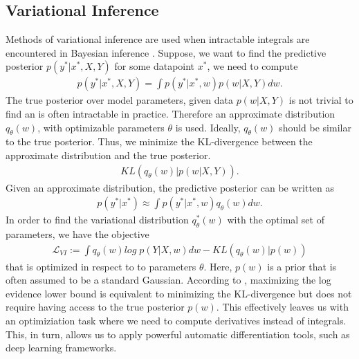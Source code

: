 \documentclass[a4paper,cleardoubleempty,BCOR1cm, 11pt]{report}
\begin{document}
\subsection{Variational Inference}\label{sec:vi}
Methods of variational inference are used when intractable integrals are encountered in Bayesian inference \cite{jordan1999introduction}. Suppose, we want to find the predictive posterior $p(y^*|x^*, X,Y)$ for some datapoint $x^*$, we need to compute
\begin{align*}
p(y^*|x^*, X,Y) = \int p(y^*|x^*, w)p(w|X,Y)dw.
\end{align*}
The true posterior over model parameters, given data $p(w|X,Y)$ is not trivial to find an is often intractable in practice. Therefore an approximate distribution $q_{\theta}(w)$, with optimizable parameters $\theta$ is used. Ideally, $q_{\theta}(w)$ should be similar to the true posterior. Thus, we minimize the KL-divergence between the approximate distribution and the true posterior.
\begin{align*}
KL(q_{\theta}(w)|p(w|X,Y)).
\end{align*}
Given an approximate distribution, the predictive posterior can be written as
\begin{align*}
p(y^*|x^*) \approx \int p(y^*|x^*, w)q_{\theta}(w)dw.
\end{align*}
In order to find the variational distribution $q_{\theta}^*(w)$ with the optimal set of parameters, we have the objective
\begin{align*}
\mathcal{L}_{VI} := \int q_{\theta}(w) log\;p(Y|X, w)dw - KL(q_{\theta}(w)|p(w))
\end{align*}
that is optimized in respect to to parameters $\theta$. Here, $p(w)$ is a prior that is often assumed to be a standard Gaussian. According to \citet{bishop2006pattern}, maximizing the log evidence lower bound is equivalent to minimizing the KL-divergence but does not require having access to the true posterior $p(w)$. This effectively leaves us with an optimiziation task where we need to compute derivatives instead of integrals. This, in turn, allows us to apply powerful automatic differentiation tools, such as deep learning frameworks.
\end{document}
